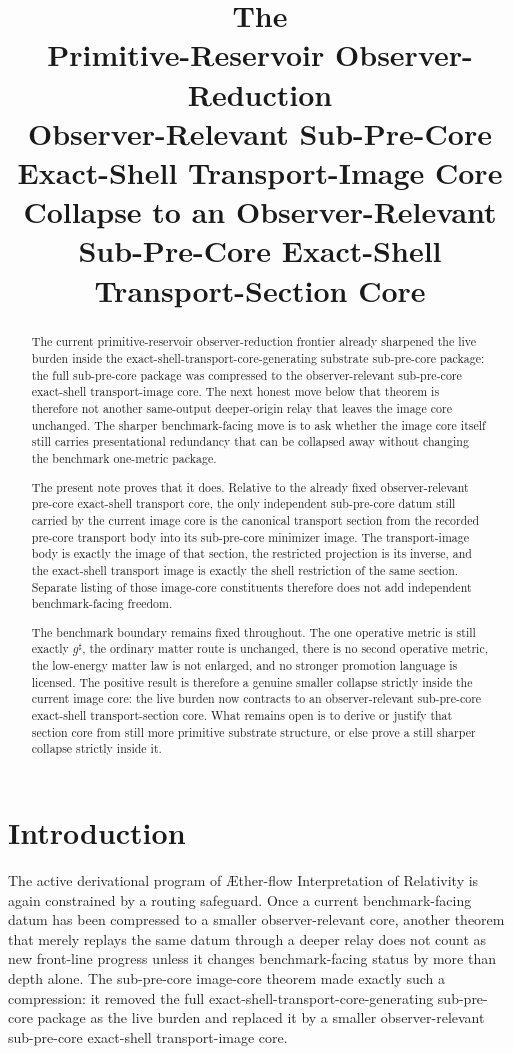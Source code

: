 \documentclass[11pt]{article}
\title{\textbf{The \TheoryName{}}\\[0.4em]
\large Primitive-Reservoir Observer-Reduction\\
\large Observer-Relevant Sub-Pre-Core Exact-Shell Transport-Image Core\\
\large Collapse to an Observer-Relevant Sub-Pre-Core Exact-Shell Transport-Section Core}
\author{}
\date{}
\newcommand{\Aflow}{\AE{}ther-flow}
\newcommand{\TheoryName}{\Aflow{} Interpretation of Relativity}
\newcommand{\CompletedMetric}{g^{\sharp}}
\begin{document}
\maketitle

\begin{abstract}
The current primitive-reservoir observer-reduction frontier already sharpened the live burden inside the exact-shell-transport-core-generating substrate sub-pre-core package: the full sub-pre-core package was compressed to the observer-relevant sub-pre-core exact-shell transport-image core. The next honest move below that theorem is therefore not another same-output deeper-origin relay that leaves the image core unchanged. The sharper benchmark-facing move is to ask whether the image core itself still carries presentational redundancy that can be collapsed away without changing the benchmark one-metric package.

The present note proves that it does. Relative to the already fixed observer-relevant pre-core exact-shell transport core, the only independent sub-pre-core datum still carried by the current image core is the canonical transport section from the recorded pre-core transport body into its sub-pre-core minimizer image. The transport-image body is exactly the image of that section, the restricted projection is its inverse, and the exact-shell transport image is exactly the shell restriction of the same section. Separate listing of those image-core constituents therefore does not add independent benchmark-facing freedom.

The benchmark boundary remains fixed throughout. The one operative metric is still exactly \(\CompletedMetric\), the ordinary matter route is unchanged, there is no second operative metric, the low-energy matter law is not enlarged, and no stronger promotion language is licensed. The positive result is therefore a genuine smaller collapse strictly inside the current image core: the live burden now contracts to an observer-relevant sub-pre-core exact-shell transport-section core. What remains open is to derive or justify that section core from still more primitive substrate structure, or else prove a still sharper collapse strictly inside it.
\end{abstract}

\section{Introduction}

The active derivational program of \TheoryName{} is again constrained by a routing safeguard. Once a current benchmark-facing datum has been compressed to a smaller observer-relevant core, another theorem that merely replays the same datum through a deeper relay does not count as new front-line progress unless it changes benchmark-facing status by more than depth alone. The sub-pre-core image-core theorem made exactly such a compression: it removed the full exact-shell-transport-core-generating sub-pre-core package as the live burden and replaced it by a smaller observer-relevant sub-pre-core exact-shell transport-image core.
\end{document}
